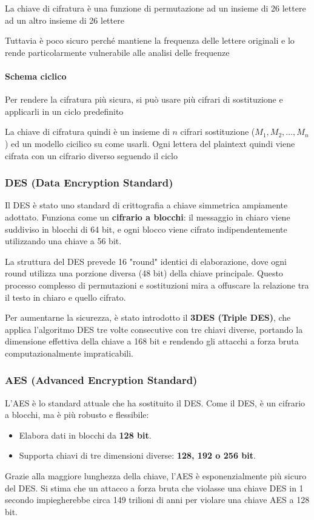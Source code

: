 La chiave di cifratura è una funzione di permutazione ad un insieme di 26 lettere ad un altro insieme di 26 lettere

Tuttavia è poco sicuro perché mantiene la frequenza delle lettere originali e lo rende particolarmente vulnerabile alle analisi delle frequenze

\paragraph{Schema ciclico} Per rendere la cifratura più sicura, si può usare più cifrari di sostituzione e applicarli in un ciclo predefinito

La chiave di cifratura quindi è un insieme di $n$ cifrari sostituzione ($M_1,M_2,\dots,M_n$) ed un modello cicilico su come usarli. Ogni lettera del plaintext quindi viene cifrata con un cifrario diverso seguendo il ciclo 

\subsubsection{DES (Data Encryption Standard)}
Il DES è stato uno standard di crittografia a chiave simmetrica ampiamente adottato. Funziona come un \textbf{cifrario a blocchi}: il messaggio in chiaro viene suddiviso in blocchi di 64 bit, e ogni blocco viene cifrato indipendentemente utilizzando una chiave a 56 bit.

La struttura del DES prevede 16 "round" identici di elaborazione, dove ogni round utilizza una porzione diversa (48 bit) della chiave principale. Questo processo complesso di permutazioni e sostituzioni mira a offuscare la relazione tra il testo in chiaro e quello cifrato.


Per aumentarne la sicurezza, è stato introdotto il \textbf{3DES (Triple DES)}, che applica l'algoritmo DES tre volte consecutive con tre chiavi diverse, portando la dimensione effettiva della chiave a 168 bit e rendendo gli attacchi a forza bruta computazionalmente impraticabili.

\subsubsection{AES (Advanced Encryption Standard)}
L'AES è lo standard attuale che ha sostituito il DES. Come il DES, è un cifrario a blocchi, ma è più robusto e flessibile:
\begin{itemize}
    \item Elabora dati in blocchi da \textbf{128 bit}.
    \item Supporta chiavi di tre dimensioni diverse: \textbf{128, 192 o 256 bit}.
\end{itemize}
Grazie alla maggiore lunghezza della chiave, l'AES è esponenzialmente più sicuro del DES. Si stima che un attacco a forza bruta che violasse una chiave DES in 1 secondo impiegherebbe circa 149 trilioni di anni per violare una chiave AES a 128 bit.

